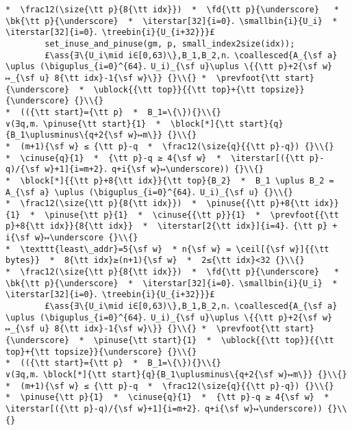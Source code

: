 \documentclass[10pt,twoside]{report}
\makeatletter
\newcommand{\ml}[2][t]{\mbox{\mdseries\begin{tabular}[#1]{@{}L@{}}#2\end{tabular}}}
\newcommand{\ass}[1]{\ensuremath{{\color{blue}\left\{\ml[c]{#1}\right\}}}}
\renewcommand{\ceil}[2][]{\left\lceil{#2}\right\rceil_{#1}}
\newcommand{\iterstar}[2][]{\text{\LARGE $*$}^{#1}_{#2}}
\makeatother
\begin{document}
\begin{lstlisting}
*  \frac12(\size{\tt p}{8{\tt idx}})  *  \fd{\tt p}{\underscore}   *  \bk{\tt p}{\underscore}  *  \iterstar[32]{i=0}．\smallbin{i}{U_i}  *  \iterstar[32]{i=0}．\treebin{i}{U_{i+32}}}£ 
        set_inuse_and_pinuse(gm, p, small_index2size(idx));
        £\ass{∃\{U_i\mid i∈[0,63)\},B_1,B_2,n．\coallesced{A_{\sf a} \uplus (\biguplus_{i=0}^{64}．U_i)_{\sf u}\uplus \{{\tt p}+2{\sf w}↦_{\sf u} 8{\tt idx}-1{\sf w}\}} {}\\{} *  \prevfoot{\tt start}{\underscore}  *  \ublock{{\tt top}}{{\tt top}+{\tt topsize}}{\underscore} {}\\{}
*  (({\tt start}={\tt p}  *  B_1=\{\}){}\\{}
∨(∃q,m．\pinuse{\tt start}{1}  *  \block[*]{\tt start}{q}{B_1\uplusminus\{q+2{\sf w}↦m\}} {}\\{}
*  (m+1){\sf w} ≤ {\tt p}-q  *  \frac12(\size{q}{{\tt p}-q}) {}\\{}
*  \cinuse{q}{1}  *  {\tt p}-q ≥ 4{\sf w}  *  \iterstar[({\tt p}-q)/{\sf w}+1]{i=m+2}．q+i{\sf w}↦\underscore)) {}\\{}
*  \block[*]{{\tt p}+8{\tt idx}}{\tt top}{B_2}  *  B_1 \uplus B_2 = A_{\sf a} \uplus (\biguplus_{i=0}^{64}．U_i)_{\sf u} {}\\{}
*  \frac12(\size{\tt p}{8{\tt idx}})  *  \pinuse{{\tt p}+8{\tt idx}}{1}  *  \pinuse{\tt p}{1}  *  \cinuse{{\tt p}}{1}  *  \prevfoot{{\tt p}+8{\tt idx}}{8{\tt idx}}  *  \iterstar[2{\tt idx}]{i=4}．{\tt p} + i{\sf w}↦\underscore {}\\{}
*  \texttt{least\_addr}=5{\sf w}  * n{\sf w} = \ceil[{\sf w}]{{\tt bytes}}  *  8{\tt idx}≥(n+1){\sf w}  *  2≤{\tt idx}<32 {}\\{}
*  \frac12(\size{\tt p}{8{\tt idx}})  *  \fd{\tt p}{\underscore}   *  \bk{\tt p}{\underscore}  *  \iterstar[32]{i=0}．\smallbin{i}{U_i}  *  \iterstar[32]{i=0}．\treebin{i}{U_{i+32}}}£ 
        £\ass{∃\{U_i\mid i∈[0,63)\},B_1,B_2,n．\coallesced{A_{\sf a} \uplus (\biguplus_{i=0}^{64}．U_i)_{\sf u}\uplus \{{\tt p}+2{\sf w}↦_{\sf u} 8{\tt idx}-1{\sf w}\}} {}\\{} *  \prevfoot{\tt start}{\underscore}  *  \pinuse{\tt start}{1}  *  \ublock{{\tt top}}{{\tt top}+{\tt topsize}}{\underscore} {}\\{}
*  (({\tt start}={\tt p}  *  B_1=\{\}){}\\{}
∨(∃q,m．\block[*]{\tt start}{q}{B_1\uplusminus\{q+2{\sf w}↦m\}} {}\\{}
*  (m+1){\sf w} ≤ {\tt p}-q  *  \frac12(\size{q}{{\tt p}-q}) {}\\{}
*  \pinuse{\tt p}{1}  *  \cinuse{q}{1}  *  {\tt p}-q ≥ 4{\sf w}  *  \iterstar[({\tt p}-q)/{\sf w}+1]{i=m+2}．q+i{\sf w}↦\underscore)) {}\\{}

\end{lstlisting}
\end{document}
